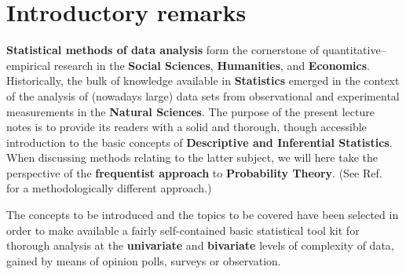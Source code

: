 \chapter*{Introductory remarks}
\textbf{Statistical methods of data analysis} form the cornerstone
of quantitative--empirical research in the \textbf{Social
Sciences}, \textbf{Humanities}, and \textbf{Economics}.
Historically, the bulk of knowledge available in
\textbf{Statistics} emerged in the context of the analysis of
(nowadays large) data sets from observational and experimental
measurements in the \textbf{ Natural Sciences}. The purpose of the
present lecture notes is to provide its readers with a solid and
thorough, though accessible introduction to the basic concepts of
\textbf{Descriptive and Inferential Statistics}. When discussing
methods relating to the latter subject, we will here take the
perspective of the \textbf{frequentist approach} to
\textbf{Probability Theory}. (See Ref.~ for a
methodologically different approach.)

\medskip
\noindent
The concepts to be introduced and the topics to be covered 
have been selected in order to make available a fairly 
self-contained basic statistical tool kit for thorough analysis 
at the \textbf{univariate} and \textbf{bivariate} levels of
complexity of data, gained by means of opinion polls, surveys or
observation.
%

